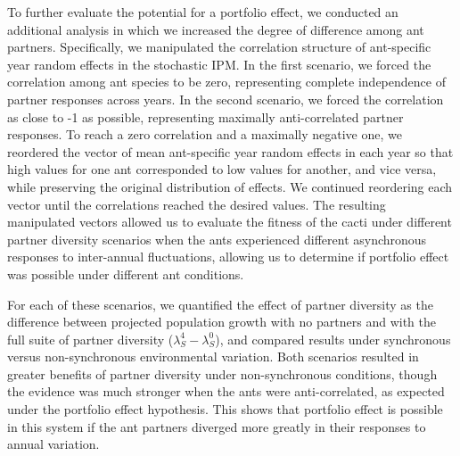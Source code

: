 \documentclass[11pt]{article}
\begin{document}
To further evaluate the potential for a portfolio effect, we conducted an additional analysis in which we increased the degree of difference among ant partners. 
Specifically, we manipulated the correlation structure of ant-specific year random effects in the stochastic IPM. 
In the first scenario, we forced the correlation among ant species to be zero, representing complete independence of partner responses across years. 
In the second scenario, we forced the correlation as close to -1 as possible, representing maximally anti-correlated partner responses.
To reach a zero correlation and a maximally negative one, we reordered the vector of mean ant-specific year random effects in each year so that high values for one ant corresponded to low values for another, and vice versa, while preserving the original distribution of effects. 
We continued reordering each vector until the correlations reached the desired values. 
The resulting manipulated vectors allowed us to evaluate the fitness of the cacti under different partner diversity scenarios when the ants experienced different asynchronous responses to inter-annual fluctuations, allowing us to determine if portfolio effect was possible under different ant conditions.


For each of these scenarios, we quantified the effect of partner diversity as the difference between projected population growth with no partners and with the full suite of partner diversity ($\lambda_S^4 - \lambda_S^0$), and compared results under synchronous versus non-synchronous environmental variation. 
Both scenarios resulted in greater benefits of partner diversity under non-synchronous conditions, though the evidence was much stronger when the ants were anti-correlated, as expected under the portfolio effect hypothesis. 
This shows that portfolio effect is possible in this system if the ant partners diverged more greatly in their responses to annual variation. 
\end{document}
